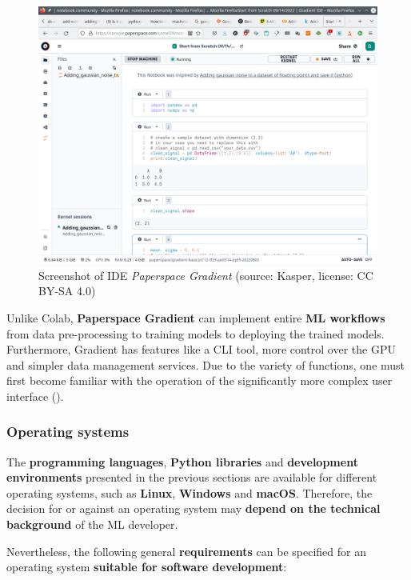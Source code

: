 \documentclass [oneside,10pt,a4paper,ngerman,BCOR10mm,headsepline,parindent,final]{scrartcl}
\begin{document}
\begin{figure}
\centering
\includegraphics{images/Screenshot_Paperspace_Gradient.png}
\caption{Screenshot of IDE \emph{Paperspace Gradient} (source: Kasper,
license: CC BY-SA 4.0)}
\end{figure}

Unlike Colab, \textbf{Paperspace Gradient} can implement entire
\textbf{ML workflows} from data pre-processing to training models to
deploying the trained models. Furthermore, Gradient has features like a
CLI tool, more control over the GPU and simpler data management
services. Due to the variety of functions, one must first become
familiar with the operation of the significantly more complex user
interface (\cite{Free_GPUs_for_ML_2020}).

    \hypertarget{operating-systems}{%
\subsubsection{Operating systems}\label{operating-systems}}

The \textbf{programming languages}, \textbf{Python libraries} and
\textbf{development environments} presented in the previous sections are
available for different operating systems, such as \textbf{Linux},
\textbf{Windows} and \textbf{macOS}. Therefore, the decision for or
against an operating system may \textbf{depend on the technical
background} of the ML developer.

Nevertheless, the following general \textbf{requirements} can be
specified for an operating system \textbf{suitable for software
development}:
\end{document}
